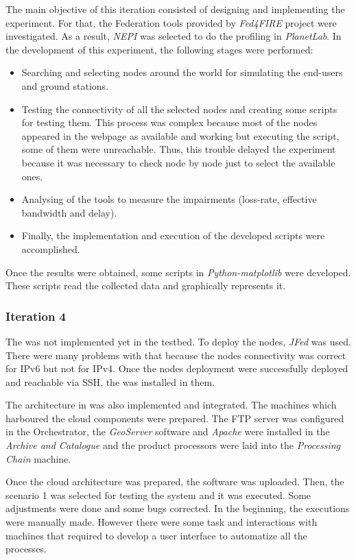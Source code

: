 The main objective of this iteration consisted of designing and implementing  the
\pl experiment. For that, the Federation tools provided by  \emph{Fed4FIRE}
project were investigated. As a result, \emph{NEPI} was selected to do the
profiling  in \emph{PlanetLab}. 
In the development of this experiment, the following stages were performed:
\begin{itemize}
\item Searching and selecting nodes around the world for simulating the
  end-users and ground stations.
\item Testing the connectivity of all the selected nodes and creating some scripts
  for testing them. This process was complex because most of the nodes
  appeared in the \pl webpage as available and working but executing the script,
  some of them were unreachable. Thus, this trouble delayed the experiment
  because it was necessary to check node by node just to select the available ones.
\item Analysing of the tools to measure the impairments (loss-rate, effective
  bandwidth and delay).
\item Finally, the implementation and execution of the developed scripts were accomplished.
\end{itemize}

Once the results were obtained, some scripts in \emph{Python-matplotlib} were
developed. These scripts read the collected data and graphically represents it.

\subsubsection{Iteration 4}

The \sss was not implemented yet in the \vw testbed. To deploy the nodes,
\emph{JFed} was used. There were many problems with that
because the nodes connectivity was correct for \ac{IP}v6 but not for
\ac{IP}v4. Once the nodes deployment were successfully deployed and reachable
via \ac{SSH}, the \sss was installed in them.  

The architecture in \bonfire was also implemented and integrated. The
machines which harboured the cloud components were prepared. The \ac{FTP} server
was configured in the Orchestrator, the \emph{GeoServer} software and
\emph{Apache} were installed
in the \emph{Archive and Catalogue} and the product processors were laid into
the \emph{Processing Chain} machine.

Once the cloud architecture was prepared, the software was uploaded. Then, the
scenario 1 was selected for testing the system and it was executed. Some
adjustments were done and some bugs corrected. In the beginning, the executions
were manually made. However there were some task and
interactions with machines that required to develop a user interface to
automatize all the processes.

